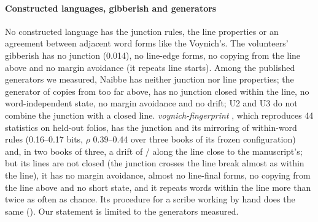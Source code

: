 \paragraph{Constructed languages, gibberish and generators} No constructed language has the junction rules, the line
properties or an agreement between adjacent word forms like the Voynich's. The volunteers' gibberish has no junction
(0.014), no line-edge forms, no copying from the line above and no margin avoidance (it repeats line starts). Among the
published generators we measured, Naibbe has neither junction nor line properties; the generator of
\citet{timmschinner2020} copies from too far above, has no junction closed within the line, no word-independent state,
no margin avoidance and no drift; U2 and U3 \citep{whitehatnetizen2026} do not combine the junction with a closed line.
\emph{voynich-fingerprint} \citep{sachak2026}, which reproduces 44 statistics on held-out folios, has the junction and
its mirroring of within-word rules (0.16--0.17 bits, $\rho$ 0.39--0.44 over three books of its frozen configuration)
and, in two books of three, a drift of / along the line close to the manuscript's; but its lines are
not closed (the junction crosses the line break almost as within the line), it has no margin avoidance, almost no
line-final forms, no copying from the line above and no short state, and it repeats words within the line more than
twice as often as chance. Its procedure for a scribe working by hand does the same (). Our statement
is limited to the generators measured.
